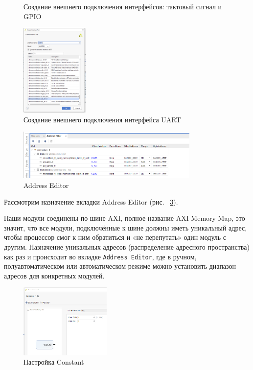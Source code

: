 \documentclass[a4paper,oneside ,10pt]{extreport}
\begin{document}
\begin{figure}[htbp]
{\begin{minipage}{8cm}
			\label{m_35}
		\end{minipage}
	}
	\caption{Создание внешнего подключения интерфейсов: тактовый сигнал и GPIO} %
\end{figure}

\begin{figure}[!ht]
	\centering
	\includegraphics[width=0.3\textwidth]{image/m_37.png}
	\caption{Создание внешнего подключения интерфейса UART}
	\label{m_37}
\end{figure}

\begin{figure}[!ht]
	\centering
	\includegraphics[width=0.8\textwidth]{image/m_39.png}
	\caption{Address Editor}
	\label{Address_Editor}
\end{figure}

Рассмотрим назначение вкладки Address Editor (рис. ~\ref{Address_Editor}).

Наши модули соединены по шине AXI, полное название AXI Memory Map, это 
значит, что все модули, подключённые к шине должны иметь уникальный адрес, 
чтобы процессор смог к ним обратиться и «не перепутать» один модуль с другим. 
Назначение уникальных адресов (распределение адресного пространства) как раз и 
происходит во вкладке \verb|Address Editor|, где в ручном, полуавтоматическом или
автоматическом режиме можно установить диапазон адресов для конкретных 
модулей.

\begin{figure}[!ht]
	\centering
	\includegraphics[width=0.4\textwidth]{image/log_1_1.png}
	\caption{Настройка Constant}
	\label{m_41}
\end{figure}
\end{document}

